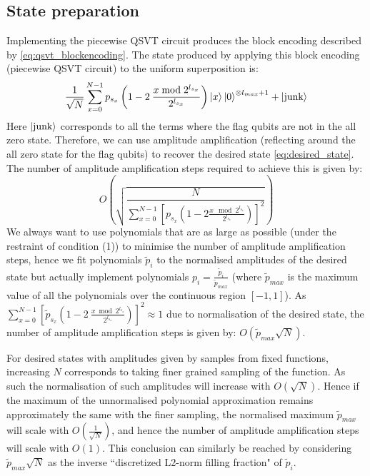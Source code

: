 \subsection{State preparation}
\label{section:state_prep}
Implementing the piecewise QSVT circuit produces the block encoding described by \eqref{eq:qsvt_blockencoding}. The state produced by applying this block encoding (piecewise QSVT circuit) to the uniform superposition is: 
\begin{equation}
    \frac{1}{\sqrt{N}}\sum_{x=0}^{N-1} p_{s_x}\left( 1 - 2\>\frac{x \bmod 2^{l_{s_x}}}{2^{l_{s_x}}}\right)  \ket{x}\ket{0}^{\otimes l_{max}+1} + \ket{\text{junk}}
\end{equation}
Here $\ket{\text{junk}}$ corresponds to all the terms where the flag qubits are not in the all zero state. Therefore, we can use amplitude amplification (reflecting around the all zero state for the flag qubits) to recover the desired state \eqref{eq:desired_state}. The number of amplitude amplification steps required to achieve this is given by:
\begin{equation}
    O\left(\sqrt{\frac{N}{\sum_{x=0}^{N-1} \left[p_{s_x}\left( 1 - 2\frac{x \mod 2^{l_{s_x}}}{2^{l_{s_x}}}\right)\right]^2}}\right)
\end{equation}
We always want to use polynomials that are as large as possible (under the restraint of condition (1)) to minimise the number of amplitude amplification steps, hence we fit polynomials $\tilde p_i$ to the normalised amplitudes of the desired state but actually implement polynomials $p_i = \frac{\tilde p_i}{\tilde p_{max}}$ (where $\tilde{p}_{max}$ is the maximum value of all the polynomials over the continuous region $[-1,1]$). As $\sum_{x=0}^{N-1} \left[ \tilde{p}_{s_x}\left( 1 - 2\>\frac{x \bmod 2^{l_{s_x}}}{2^{l_{s_x}}}\right)\right]^2 \approx 1$ due to normalisation of the desired state, the number of amplitude amplification steps is given by: $O(\tilde{p}_{max}\sqrt{N})$. 

For desired states with amplitudes given by samples from fixed functions, increasing $N$ corresponds to taking finer grained sampling of the function. As such the normalisation of such amplitudes will increase with $O(\sqrt{N})$. Hence if the maximum of the unnormalised polynomial approximation remains approximately the same with the finer sampling, the normalised maximum $\tilde{p}_{max}$ will scale with $O(\frac{1}{\sqrt{N}})$, and hence the number of amplitude amplification steps will scale with $O(1)$. This conclusion can similarly be reached by considering $\tilde{p}_{max} \sqrt{N}$ as the inverse ``discretized L2-norm filling fraction" of $\tilde{p}_i$.


